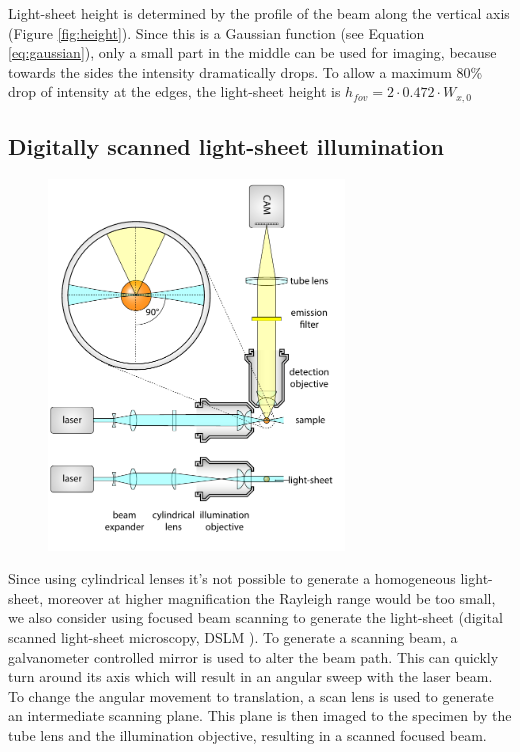     Light-sheet height is determined by the profile of the beam along the vertical axis (Figure \ref{fig:height}). Since this is a Gaussian function (see Equation \ref{eq:gaussian}), only a small part in the middle can be used for imaging, because towards the sides the intensity dramatically drops. To allow a maximum 80\% drop of intensity at the edges, the light-sheet height is $h_{fov}=2\cdot 0.472\cdot W_{x,0}$
    

  \subsection{Digitally scanned light-sheet illumination}

    \begin{figure}[bt!]
      \centering
      \includegraphics[page=2,width=0.7\textwidth]{spim_cyl}
        \label{fig:dslm}
    \end{figure}

    Since using cylindrical lenses it's not possible to generate a homogeneous light-sheet, moreover at higher magnification the Rayleigh range would be too small, we also consider using focused beam scanning to generate the light-sheet (digital scanned light-sheet microscopy, DSLM \cite{keller_reconstruction_2008}). To generate a scanning beam, a galvanometer controlled mirror is used to alter the beam path. This can quickly turn around its axis which will result in an angular sweep with the laser beam. To change the angular movement to translation, a scan lens is used to generate an intermediate scanning plane. This plane is then imaged to the specimen by the tube lens and the illumination objective, resulting in a scanned focused beam.

